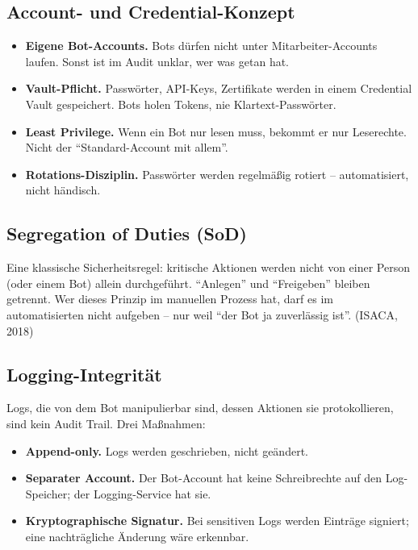 \documentclass[11pt,a4paper,oneside]{article}
\newcommand{\quelle}[1]{{\footnotesize\color{lpGray}(#1)}}
\begin{document}
\subsection{Account- und Credential-Konzept}

\begin{itemize}
  \item \textbf{Eigene Bot-Accounts.} Bots dürfen nicht unter Mitarbeiter-Accounts laufen. Sonst ist im Audit unklar, wer was getan hat.
  \item \textbf{Vault-Pflicht.} Passwörter, API-Keys, Zertifikate werden in einem Credential Vault gespeichert. Bots holen Tokens, nie Klartext-Passwörter.
  \item \textbf{Least Privilege.} Wenn ein Bot nur lesen muss, bekommt er nur Leserechte. Nicht der ``Standard-Account mit allem''.
  \item \textbf{Rotations-Disziplin.} Passwörter werden regelmäßig rotiert -- automatisiert, nicht händisch.
\end{itemize}

\subsection{Segregation of Duties (SoD)}

Eine klassische Sicherheitsregel: kritische Aktionen werden nicht von einer Person (oder einem Bot) allein durchgeführt. ``Anlegen'' und ``Freigeben'' bleiben getrennt. Wer dieses Prinzip im manuellen Prozess hat, darf es im automatisierten nicht aufgeben -- nur weil ``der Bot ja zuverlässig ist''. \quelle{ISACA, 2018}

\subsection{Logging-Integrität}

Logs, die von dem Bot manipulierbar sind, dessen Aktionen sie protokollieren, sind kein Audit Trail. Drei Maßnahmen:

\begin{itemize}
  \item \textbf{Append-only.} Logs werden geschrieben, nicht geändert.
  \item \textbf{Separater Account.} Der Bot-Account hat keine Schreibrechte auf den Log-Speicher; der Logging-Service hat sie.
  \item \textbf{Kryptographische Signatur.} Bei sensitiven Logs werden Einträge signiert; eine nachträgliche Änderung wäre erkennbar.
\end{itemize}
\end{document}
